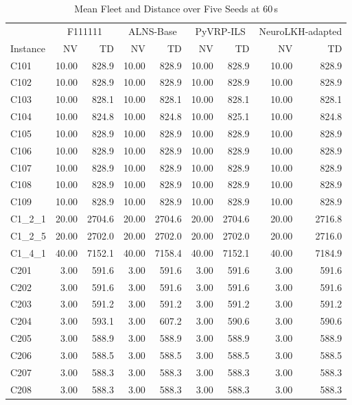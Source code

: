 \documentclass{article}
\begin{document}
{\begin{longtable}{l r r r r r r r r }
\caption{Mean Fleet and Distance over Five Seeds at 60\,s} \\
\toprule
& \multicolumn{2}{c}{F111111} & \multicolumn{2}{c}{ALNS-Base} & \multicolumn{2}{c}{PyVRP-ILS} & \multicolumn{2}{c}{NeuroLKH-adapted} \\
Instance & NV & TD & NV & TD & NV & TD & NV & TD \\
\midrule
\endhead
C101 & 10.00 & 828.9 & 10.00 & 828.9 & 10.00 & 828.9 & 10.00 & 828.9 \\
C102 & 10.00 & 828.9 & 10.00 & 828.9 & 10.00 & 828.9 & 10.00 & 828.9 \\
C103 & 10.00 & 828.1 & 10.00 & 828.1 & 10.00 & 828.1 & 10.00 & 828.1 \\
C104 & 10.00 & 824.8 & 10.00 & 824.8 & 10.00 & 825.1 & 10.00 & 824.8 \\
C105 & 10.00 & 828.9 & 10.00 & 828.9 & 10.00 & 828.9 & 10.00 & 828.9 \\
C106 & 10.00 & 828.9 & 10.00 & 828.9 & 10.00 & 828.9 & 10.00 & 828.9 \\
C107 & 10.00 & 828.9 & 10.00 & 828.9 & 10.00 & 828.9 & 10.00 & 828.9 \\
C108 & 10.00 & 828.9 & 10.00 & 828.9 & 10.00 & 828.9 & 10.00 & 828.9 \\
C109 & 10.00 & 828.9 & 10.00 & 828.9 & 10.00 & 828.9 & 10.00 & 828.9 \\
C1\_2\_1 & 20.00 & 2704.6 & 20.00 & 2704.6 & 20.00 & 2704.6 & 20.00 & 2716.8 \\
C1\_2\_5 & 20.00 & 2702.0 & 20.00 & 2702.0 & 20.00 & 2702.0 & 20.00 & 2716.0 \\
C1\_4\_1 & 40.00 & 7152.1 & 40.00 & 7158.4 & 40.00 & 7152.1 & 40.00 & 7184.9 \\
C201 & 3.00 & 591.6 & 3.00 & 591.6 & 3.00 & 591.6 & 3.00 & 591.6 \\
C202 & 3.00 & 591.6 & 3.00 & 591.6 & 3.00 & 591.6 & 3.00 & 591.6 \\
C203 & 3.00 & 591.2 & 3.00 & 591.2 & 3.00 & 591.2 & 3.00 & 591.2 \\
C204 & 3.00 & 593.1 & 3.00 & 607.2 & 3.00 & 590.6 & 3.00 & 590.6 \\
C205 & 3.00 & 588.9 & 3.00 & 588.9 & 3.00 & 588.9 & 3.00 & 588.9 \\
C206 & 3.00 & 588.5 & 3.00 & 588.5 & 3.00 & 588.5 & 3.00 & 588.5 \\
C207 & 3.00 & 588.3 & 3.00 & 588.3 & 3.00 & 588.3 & 3.00 & 588.3 \\
C208 & 3.00 & 588.3 & 3.00 & 588.3 & 3.00 & 588.3 & 3.00 & 588.3 \\

\end{longtable}}
\end{document}
